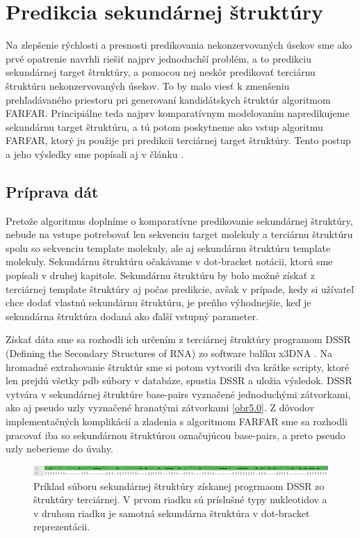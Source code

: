 \chapter{Predikcia sekundárnej štruktúry}

Na zlepšenie rýchlosti a presnosti predikovania nekonzervovaných úsekov sme ako prvé opatrenie navrhli riešiť najprv jednoduchší problém, a to predikciu sekundárnej target štruktúry, a pomocou nej neskôr predikovať terciárnu štruktúru nekonzervovaných úsekov. To by malo viesť k zmenšeniu prehľadávaného priestoru pri generovaní kandidátskych štruktúr algoritmom FARFAR. Principiálne teda najprv komparatívnym modelovaním napredikujeme sekundárnu target štruktúru, a tú potom poskytneme ako vstup algoritmu FARFAR, ktorý ju použije pri predikcii terciárnej target štruktúry. Tento postup a jeho výsledky sme popísali aj v článku \cite{8218009}.

\section{Príprava dát}
Pretože algoritmus doplníme o komparatívne predikovanie sekundárnej štruktúry, nebude na vstupe potrebovať len sekvenciu target molekuly a terciárnu štruktúru spolu so sekvenciu template molekuly, ale aj sekundárnu štruktúru template molekuly. Sekundárnu štruktúru očakávame v dot-bracket notácii, ktorú sme popísali v druhej kapitole. Sekundárnu štruktúru by bolo možné získať z terciárnej template štruktúry aj počas predikcie, avšak v prípade, kedy si užívateľ chce dodať vlastnú sekundárnu štruktúru, je preňho výhodnejšie, keď je sekundárna štruktúra dodaná ako ďalší vstupný parameter.


\indent Získať dáta sme sa rozhodli ich určením z terciárnej štruktúry programom DSSR (Defining the Secondary Structures of RNA) zo software balíku x3DNA \cite{x3dna}. Na hromadné extrahovanie štruktúr sme si potom vytvorili dva krátke scripty, ktoré len prejdú všetky pdb súbory v databáze, spustia DSSR a uložia výsledok. DSSR vytvára v sekundárnej štruktúre base-pairs vyznačené jednoduchými zátvorkami, ako aj pseudo uzly vyznačené hranatými zátvorkami \autoref{obr5.0}. Z dôvodov implementačných komplikácií a zladenia s algoritmom FARFAR sme sa rozhodli pracovať iba so sekundárnou štruktúrou označujúcou base-pairs, a preto pseudo uzly neberieme do úvahy.
\begin{figure}%
\includegraphics[width=\textwidth]{../img/dssr}
\caption{Príklad súboru sekundárnej štruktúry získanej progrmaom DSSR zo štruktúry terciárnej. V prvom riadku sú príslušné typy nukleotidov a v druhom riadku je samotná sekundárna štruktúra v  dot-bracket reprezentácii.}
\label{obr5.0}
\end{figure}

